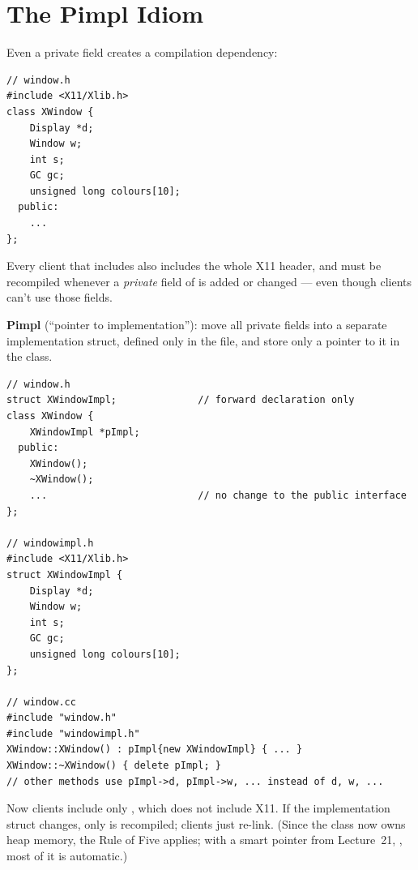 \section{The Pimpl Idiom}
Even a private field creates a compilation dependency:
\begin{lstlisting}[style=cpp]
// window.h
#include <X11/Xlib.h>
class XWindow {
    Display *d;
    Window w;
    int s;
    GC gc;
    unsigned long colours[10];
  public:
    ...
};
\end{lstlisting}
Every client that includes  also includes the whole X11 header,
and must be recompiled whenever a \emph{private} field of  is added
or changed --- even though clients can't use those fields.

\begin{definition}
\textbf{Pimpl} (``pointer to implementation''): move all private fields into a
separate implementation struct, defined only in the  file, and store
only a pointer to it in the class.
\end{definition}

\begin{lstlisting}[style=cpp]
// window.h
struct XWindowImpl;              // forward declaration only
class XWindow {
    XWindowImpl *pImpl;
  public:
    XWindow();
    ~XWindow();
    ...                          // no change to the public interface
};

// windowimpl.h
#include <X11/Xlib.h>
struct XWindowImpl {
    Display *d;
    Window w;
    int s;
    GC gc;
    unsigned long colours[10];
};

// window.cc
#include "window.h"
#include "windowimpl.h"
XWindow::XWindow() : pImpl{new XWindowImpl} { ... }
XWindow::~XWindow() { delete pImpl; }
// other methods use pImpl->d, pImpl->w, ... instead of d, w, ...
\end{lstlisting}
Now clients include only , which does not include X11. If the
implementation struct changes, only  is recompiled; clients just
re-link. (Since the class now owns heap memory, the Rule of Five applies; with a
smart pointer from Lecture~21, , most of it
is automatic.)

